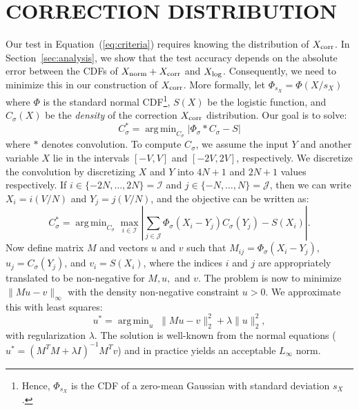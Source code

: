 \documentclass[twoside]{article} \usepackage{aistats2017}
\DeclareMathOperator*{\argmin}{arg\,min}
\begin{document}
\section{CORRECTION DISTRIBUTION}\label{sec:correction}

Our test in Equation~(\ref{eq:criteria}) requires knowing the distribution of
$X_{\rm corr}$. In Section~\ref{sec:analysis}, we show that the test accuracy
depends on the absolute error between the CDFs of $X_{\rm norm} + X_{\rm corr}$
and $X_{\rm log}$. Consequently, we need to minimize this in our construction of
$X_{\rm corr}$. More formally, let $\Phi_{s_X} = \Phi(X/s_X)$ where $\Phi$ is
the standard normal CDF\footnote{Hence, $\Phi_{s_X}$ is the CDF of a zero-mean
Gaussian with standard deviation $s_X$.}, $S(X)$ be the logistic function, and
$C_{\sigma}(X)$ be the \emph{density} of the correction $X_{\rm corr}$
distribution. Our goal is to solve:
\begin{equation}\label{eq:overall_corr_problem}
    C_\sigma^* = \argmin_{C_\sigma} |\Phi_{\sigma} * C_{\sigma} - S|
\end{equation}
where $*$ denotes convolution. To compute $C_\sigma$, we assume the input $Y$
and another variable $X$ lie in the intervals $[-V,V]$ and $[-2V,2V]$,
respectively.  We discretize the convolution by discretizing $X$ and $Y$ into
$4N+1$ and $2N+1$ values respectively. If $i \in \{-2N, \ldots,
2N\}=\mathcal{I}$ and $j \in \{-N, \ldots, N\}=\mathcal{J}$, then we can write
$X_i = i(V/N)$ and $Y_j = j(V/N)$, and the objective can be written as:
\[
C_\sigma^* = \argmin_{C_\sigma} \max_{i \in \mathcal{I}}\left|\sum_{j\in\mathcal{J}} \Phi_{\sigma}(X_i-Y_j) C_{\sigma}(Y_j) - S(X_i)\right|.
\]
Now define matrix $M$ and vectors $u$ and $v$ such that $M_{ij} =
\Phi_{\sigma}(X_i-Y_j)$, $u_j = C_{\sigma}(Y_j)$, and $v_i = S(X_i)$, where the
indices $i$ and $j$ are appropriately translated to be non-negative for $M, u,$
and $v$. The problem is now to minimize $\|Mu-v\|_{\infty}$ with the density
non-negative constraint $u > 0$. We approximate this with least squares:
\begin{equation}\label{eq:optimization_l2}
    u^* = \argmin_u\; \|Mu-v\|_2^2 + \lambda \|u\|_2^2,
\end{equation}
with regularization $\lambda$. The solution is well-known from the normal
equations ($u^* = (M^TM + \lambda I)^{-1}M^Tv$) and in practice yields an
acceptable $L_{\infty}$ norm.
\end{document}
